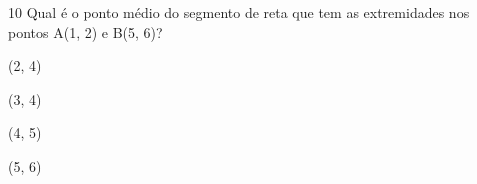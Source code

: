 



\num{10} Qual é o ponto médio do segmento de reta que tem as extremidades nos
pontos A(1, 2) e B(5, 6)?

\begin{multicols}{2}
\begin{escolha}
\item (2, 4)
\item (3, 4)
\item (4, 5)
\item (5, 6)
\end{escolha}
\end{multicols}





